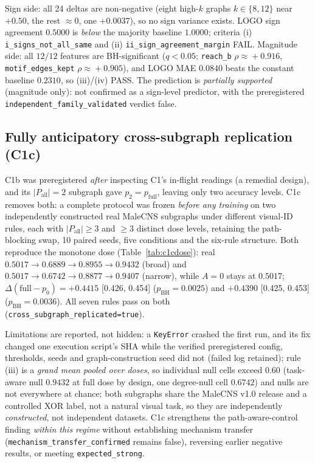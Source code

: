 \documentclass[10pt,twocolumn,letterpaper]{article}
\begin{document}
Sign side: all 24 deltas are non-negative (eight high-$k$ graphs
$k\!\in\!\{8,12\}$ near $+0.50$, the rest $\approx0$, one $+0.0037$), so no
sign variance exists. LOGO sign agreement $0.5000$ is \emph{below} the
majority baseline $1.0000$; criteria (i) \texttt{i\_signs\_not\_all\_same}
and (ii) \texttt{ii\_sign\_agreement\_margin} FAIL. Magnitude side: all
$12/12$ features are BH-significant ($q<0.05$; \texttt{reach\_b}
$\rho\!\approx\!+0.916$, \texttt{motif\_edges\_kept} $\rho\!\approx\!+0.905$),
and LOGO MAE $0.0840$ beats the constant baseline $0.2310$, so (iii)/(iv)
PASS. The prediction is \emph{partially supported} (magnitude only): not
confirmed as a sign-level predictor, with the preregistered
\texttt{independent\_family\_validated} verdict false.

\subsection{Fully anticipatory cross-subgraph replication (C1c)}
\label{sec:c1c}

C1b was preregistered \emph{after} inspecting C1's in-flight readings (a
remedial design), and its $|P_{\mathrm{all}}|=2$ subgraph gave
$p_2=p_{\mathrm{full}}$, leaving only two accuracy levels. C1c removes both: a
complete protocol was frozen \emph{before any training} on two independently
constructed real MaleCNS subgraphs under different visual-ID rules, each with
$|P_{\mathrm{all}}|\geq3$ and $\geq3$ distinct dose levels, retaining the
path-blocking swap, 10 paired seeds, five conditions and the six-rule
structure. Both reproduce the monotone dose (Table~\ref{tab:c1cdose}): real
$0.5017\!\to\!0.6889\!\to\!0.8955\!\to\!0.9432$ (broad) and
$0.5017\!\to\!0.6742\!\to\!0.8877\!\to\!0.9407$ (narrow), while $A{=}0$ stays
at $0.5017$; $\Delta(\mathrm{full}-p_0)=+0.4415$ [0.426, 0.454]
($p_{\mathrm{BH}}=0.0025$) and $+0.4390$ [0.425, 0.453]
($p_{\mathrm{BH}}=0.0036$). All seven rules pass on both
(\texttt{cross\_subgraph\_replicated=true}).

Limitations are reported, not hidden: a \texttt{KeyError} crashed the first
run, and its fix changed one execution script's SHA while the verified
preregistered config, thresholds, seeds and graph-construction seed did not
(failed log retained); rule (iii) is a \emph{grand mean pooled over doses}, so
individual null cells exceed $0.60$ (task-aware null $0.9432$ at full dose by
design, one degree-null cell $0.6742$) and nulls are not everywhere at chance;
both subgraphs share the MaleCNS v1.0 release and a controlled XOR label, not
a natural visual task, so they are independently \emph{constructed}, not
independent datasets. C1c strengthens the path-aware-control finding
\emph{within this regime} without establishing mechanism transfer
(\texttt{mechanism\_transfer\_confirmed} remains false), reversing earlier
negative results, or meeting \texttt{expected\_strong}.
\end{document}
